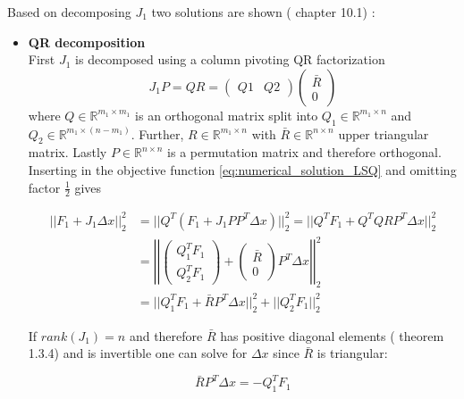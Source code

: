 \documentclass{scrartcl}[12pt, halfparskip]
\numberwithin{equation}{section}
\numberwithin{figure}{section}
\numberwithin{table}{section}
\begin{document}
Based on decomposing $J_1$ two solutions are shown (\cite{nonlinear_optimiziation_wright} chapter 10.1) :

\begin{itemize}
	\item \textbf{QR decomposition} \\
	First $J_1$ is decomposed using a column pivoting QR factorization
	\begin{equation}
		J_1 P = Q R = 
		\begin{pmatrix}
			Q1 & Q2
		\end{pmatrix}
		\begin{pmatrix}
			\bar{R} \\
			0
		\end{pmatrix}
	\end{equation}
	where $Q \in \mathbb{R}^{m_1 \times m_1}$ is an orthogonal matrix split into $Q_1 \in \mathbb{R}^{m_1 \times n}$ and $Q_2 \in \mathbb{R}^{m_1 \times (n-m_1)}$. Further, $R \in \mathbb{R}^{m_1 \times n}$ with $\bar{R} \in \mathbb{R}^{n \times n}$ upper triangular matrix. Lastly $P \in \mathbb{R}^{n \times n}$ is a permutation matrix and therefore orthogonal. Inserting in the objective function \cref{eq:numerical_solution_LSQ} and omitting factor $\frac{1}{2}$ gives
	
	\begin{align}
		|| F_1 + J_1 \Delta x ||_2^2 & = || Q^T (F_1 + J_1 P P^T \Delta x) ||_2^2 = || Q^T F_1 + Q^T Q R P^T \Delta x ||_2^2 \\
		& = \left| \left| \begin{pmatrix}
		Q_1^T F_1 \\
		Q_2^T F_1
		\end{pmatrix} + 
		\begin{pmatrix}
		\bar{R} \\
		0
		\end{pmatrix}
		P^T \Delta x \right| \right|_2^2 \nonumber \\
		& = || Q_1^T F_1 + \bar{R} P^T \Delta x ||_2^2 + ||Q_2^T F_1 ||_2^2 \nonumber
	\end{align}
	
	If $rank(J_1)=n$ and therefore $\bar{R}$ has positive diagonal elements (\cite{numerical_methods_lsq_Bjorck} theorem 1.3.4) and is invertible  one can solve for $\Delta x$ since $\bar{R}$ is triangular:
	
	\begin{equation}
		\bar{R} P^T \Delta x = -Q_1^T F_1
	\end{equation}
	

\end{itemize}
\end{document}
